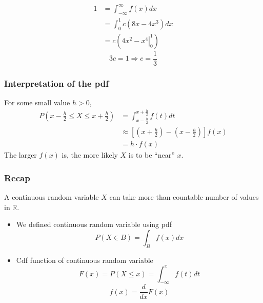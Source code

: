 \documentclass[slidestop,compress,mathserif]{beamer}
\begin{document}
\begin{frame}\frametitle{}

\pause
\begin{align*}
1  & = \int_{-\infty}^{\infty} f(x) dx\\
& = \int_{0}^{1} c (8x - 4x^3) dx\\
& = c \left( \left. 4x^2 - x^4 \right|_0^1 \right)
\end{align*}
\[ 3c = 1 \Longrightarrow c = \frac{1}{3}  \]


\end{frame}
\begin{frame}\frametitle{Interpretation of the pdf}
For some small value $h>0$,
\begin{align*}
P\left(x - \frac{h}{2} \leq X \leq x + \frac{h}{2} \right) & = \int_{x - \frac{h}{2}}^{x + \frac{h}{2}} f(t)dt\\
& \approx \left[ (x + \frac{h}{2}) - (x - \frac{h}{2}) \right] f(x)\\
& = h \cdot f(x)
\end{align*}
The larger $f(x)$ is, the more likely $X$ is to be ``near'' $x$.
\end{frame}


\begin{frame}\frametitle{Recap}

A continuous random variable $X$ can take more than countable number of values in $\mathbb{R}$.
\begin{itemize}
\item We defined continuous random variable using pdf
\[ P(X \in B) = \int_B f(x) dx \]
\pause
\item Cdf function of continuous random variable
\[ F(x) = P(X \leq x) =  \int_{-\infty}^{x} f(t) dt \]
\[ f(x) = \frac{d}{dx}F(x) \]
\end{itemize}

\end{frame}
\end{document}
